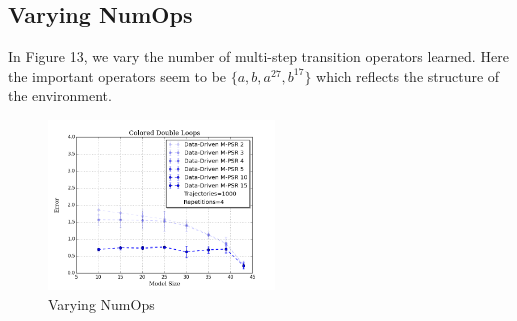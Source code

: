 \subsection{Varying NumOps}

In Figure 13, we vary the number of multi-step transition operators learned. Here the important operators seem to be $\{a,b,a^{27},b^{17}\}$ which reflects the structure of the environment.

\begin{figure}[ht!]
\centering
\includegraphics[width=60mm]{uCOREPICS/DLMO/numOpComparison.png}
\caption{Varying NumOps\label{overflow}}
\end{figure}
